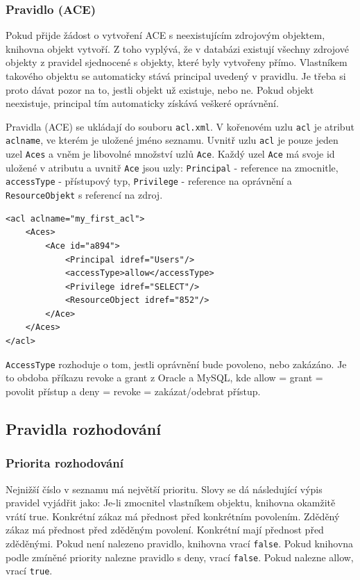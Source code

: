 \subsubsection{Pravidlo (ACE)}

Pokud přijde žádost o vytvoření ACE s neexistujícím zdrojovým objektem, knihovna objekt vytvoří. Z toho vyplývá, že v databázi existují všechny zdrojové objekty z pravidel sjednocené s objekty, které byly vytvořeny přímo. Vlastníkem takového objektu se automaticky stává principal uvedený v pravidlu. Je třeba si proto dávat pozor na to, jestli objekt už existuje, nebo ne. Pokud objekt neexistuje, principal tím automaticky získává veškeré oprávnění.

Pravidla (ACE) se ukládají do souboru \verb|acl.xml|. V kořenovém uzlu \verb|acl| je atribut \verb|aclname|, ve kterém je uložené jméno seznamu. Uvnitř uzlu \verb|acl| je pouze jeden uzel \verb|Aces| a vněm je libovolné množství uzlů \verb|Ace|. Každý uzel \verb|Ace| má svoje id uložené v atributu a uvnitř \verb|Ace| jsou uzly: \verb|Principal| - reference na zmocnitle, \verb|accessType| - přístupový typ, \verb|Privilege| - reference na oprávnění a \verb|ResourceObjekt| s referencí na zdroj.

\begin{lstlisting}
<acl aclname="my_first_acl">
    <Aces>
        <Ace id="a894">
            <Principal idref="Users"/>
            <accessType>allow</accessType>
            <Privilege idref="SELECT"/>
            <ResourceObject idref="852"/>
        </Ace>
    </Aces>
</acl>
\end{lstlisting}

\verb|AccessType| rozhoduje o tom, jestli oprávnění bude povoleno, nebo zakázáno. Je to obdoba příkazu revoke a grant z Oracle a MySQL, kde allow = grant = povolit přístup a deny = revoke = zakázat/odebrat přístup.


\subsection{Pravidla rozhodování}
\subsubsection{Priorita rozhodování}
\label{Priorita rozhodování}

Nejnižší číslo v seznamu má největší prioritu. Slovy se dá následující výpis pravidel vyjádřit jako: Je-li zmocnitel vlastníkem objektu, knihovna okamžitě vrátí true. Konkrétní zákaz má přednost před konkrétním povolením. Zděděný zákaz má přednost před zděděným povolení. Konkrétní mají přednost před zděděnými. Pokud není nalezeno pravidlo, knihovna vrací \verb|false|. Pokud knihovna podle zmíněné priority nalezne pravidlo s deny, vrací \verb|false|. Pokud nalezne allow, vrací \verb|true|.

